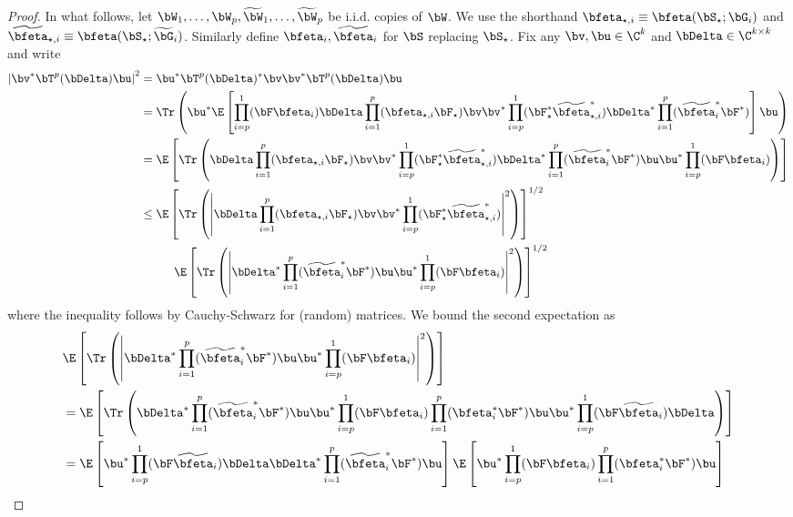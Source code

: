 \begin{proof}
In what follows, 
let $\bW_1,\dots,\bW_p, \widetilde \bW_1,\dots,\widetilde\bW_p$ be i.i.d. copies of $\bW$.
We use the shorthand $\bfeta_{\star,i} \equiv \bfeta(\bS_\star;\bG_i)$ and 
$\widetilde\bfeta_{\star,i} \equiv \bfeta(\bS_\star;\widetilde\bG_i)$. Similarly define $\bfeta_i, \widetilde\bfeta_i$ for $\bS$ replacing $\bS_\star$.
Fix any $\bv,\bu\in \C^{k}$ and $\bDelta \in \C^{k\times k}$ and write
\begin{align*}
\left|\bv^* \bT^p(\bDelta) \bu\right|^2
&=  \bu^* \bT^p(\bDelta)^* \bv \bv^*  \bT^p(\bDelta) \bu\\
&=  \Tr\left(
\bu^*\E\left[
\prod_{i=p}^1 (\bF \bfeta_i)\bDelta \prod_{i=1}^p(\bfeta_{\star,i} \bF_\star)
\bv\bv^*
\prod_{i=p}^1 ( \bF_\star^*\widetilde \bfeta_{\star,i}^*)
\bDelta^*
\prod_{i=1}^p ( \widetilde \bfeta_{i}^*\bF^*)
\right]\bu
\right)
\\
&= 
\E\left[
\Tr\left(
\bDelta \prod_{i=1}^p(\bfeta_{\star,i} \bF_\star)
\bv\bv^*
\prod_{i=p}^1 ( \bF_\star^*\widetilde \bfeta_{\star,i}^* )
\bDelta^*
\prod_{i=1}^p ( \widetilde \bfeta_{i}^*\bF^*)
\bu\bu^*
\prod_{i=p}^1 (\bF \bfeta_i)
\right)
\right]
\\
&\le 
\E\left[
\Tr\left(
\left|
\bDelta \prod_{i=1}^p(\bfeta_{\star,i} \bF_\star)
\bv\bv^*
\prod_{i=p}^1 ( \bF_\star^*\widetilde \bfeta_{\star,i}^* )
\right|^2\right) \right]^{1/2}\\
&\hspace{10mm}
\E\left[\Tr\left(
\left|
\bDelta^*
\prod_{i=1}^p ( \widetilde \bfeta_{i}^*\bF^*)\bu\bu^*
\prod_{i=p}^1 (\bF \bfeta_i)
\right|^2
\right)
\right]^{1/2}
\end{align*}
where the inequality follows by Cauchy-Schwarz for (random) 
matrices.
We bound the second expectation as 
\begin{align*}
&\E\left[\Tr\left(
\left|
\bDelta^*
\prod_{i=1}^p ( \widetilde \bfeta_{i}^*\bF^*)
\bu\bu^*
\prod_{i=p}^1 (\bF \bfeta_i)
\right|^2
\right)
\right]\\
&=
\E\left[\Tr\left(
\bDelta^*
\prod_{i=1}^p ( \widetilde \bfeta_{i}^*\bF^*)
\bu\bu^*
\prod_{i=p}^1 (\bF \bfeta_i)
\prod_{i=1}^p (\bfeta_i^*\bF^* )
\bu\bu^*
\prod_{i=p}^1 (\bF \widetilde \bfeta_{i})
\bDelta
\right)
\right]\\
&=
\E\left[
\bu^*
\prod_{i=p}^1 (\bF \widetilde \bfeta_{i})
\bDelta
\bDelta^*
\prod_{i=1}^p ( \widetilde \bfeta_{i}^*\bF^*)
\bu
\right]
\E\left[
\bu^*
\prod_{i=p}^1 (\bF \bfeta_i)
\prod_{i=1}^p (\bfeta_i^*\bF^* )
\bu
\right]
\\

\end{align*}
\end{proof}
